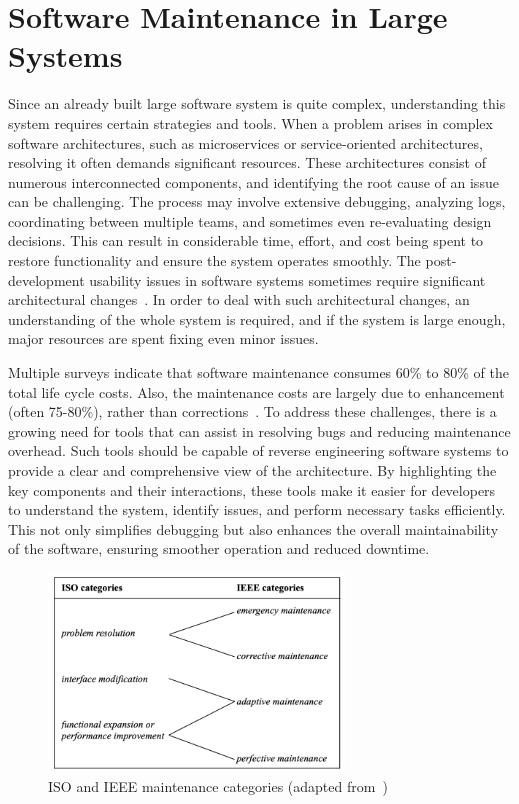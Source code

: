 \section{Software Maintenance in Large Systems}

Since an already built large software system is quite complex, understanding this system requires certain strategies and tools. When a problem arises in complex software architectures, such as microservices or service-oriented architectures, resolving it often demands significant resources. These architectures consist of numerous interconnected components, and identifying the root cause of an issue can be challenging. The process may involve extensive debugging, analyzing logs, coordinating between multiple teams, and sometimes even re-evaluating design decisions. This can result in considerable time, effort, and cost being spent to restore functionality and ensure the system operates smoothly. The post-development usability issues in software systems sometimes require significant architectural changes~\citep{Folmer2005}. In order to deal with such architectural changes, an understanding of the whole system is required, and if the system is large enough, major resources are spent fixing even minor issues.

 Multiple surveys indicate that software maintenance consumes 60\% to 80\% of the total life cycle costs. Also, the maintenance costs are largely due to enhancement (often 75{-}80\%), rather than corrections~\citep{SeMaintainance2001}. To address these challenges, there is a growing need for tools that can assist in resolving bugs and reducing maintenance overhead. Such tools should be capable of reverse engineering software systems to provide a clear and comprehensive view of the architecture. By highlighting the key components and their interactions, these tools make it easier for developers to understand the system, identify issues, and perform necessary tasks efficiently. This not only simplifies debugging but also enhances the overall maintainability of the software, ensuring smoother operation and reduced downtime.

\begin{figure}[H]
    \centering
    \includegraphics[width=0.7\textwidth]{figures/maintenance_process.png}
    \caption{ISO and IEEE maintenance categories (adapted from~\cite{SeMaintainance2001})}
	\label{fig_se_maintenance}
\end{figure}